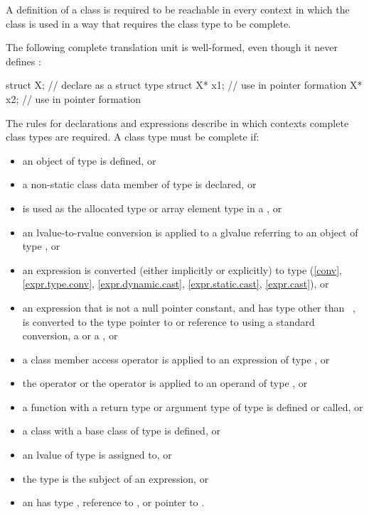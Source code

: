 \pnum
{}%
A definition of a class is required to be reachable in every context in which
the class is used in a way that requires the class type to be complete.
\begin{example}
The following complete translation unit is well-formed,
even though it never defines :
\begin{codeblock}
struct X;                       // declare  as a struct type
struct X* x1;                   // use  in pointer formation
X* x2;                          // use  in pointer formation
\end{codeblock}
\end{example}
\begin{note}
The rules for declarations and expressions
describe in which contexts complete class types are required. A class
type  must be complete if:
\begin{itemize}
\item an object of type  is defined, or
\item a non-static class data member of type  is
declared, or
\item {} is used as the allocated type or array element type in a
, or
\item an lvalue-to-rvalue conversion is applied to
a glvalue referring
to an object of type , or
\item an expression is converted (either implicitly or explicitly) to
type  (\ref{conv}, \ref{expr.type.conv},
\ref{expr.dynamic.cast}, \ref{expr.static.cast}, \ref{expr.cast}), or
\item an expression that is not a null pointer constant, and has type
other than \cv{}~, is converted to the type pointer to 
or reference to  using a standard conversion,
a  or
a , or
\item a class member access operator is applied to an expression of type
, or
\item the  operator or the
 operator is applied to an operand of
type , or
\item a function with a return type or argument type of type 
is defined or called, or
\item a class with a base class of type  is
defined, or
\item an lvalue of type  is assigned to, or
\item the type  is the subject of an
 expression, or
\item an  has type , reference to
, or pointer to .
\end{itemize}
\end{note}

